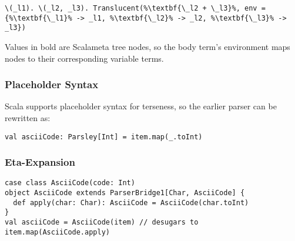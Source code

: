 \documentclass[../../main.tex]{subfiles}
\begin{document}
\begin{lstlisting}
\(_l1). \(_l2, _l3). Translucent(%\textbf{\_l2 + \_l3}%, env = {%\textbf{\_l1}% -> _l1, %\textbf{\_l2}% -> _l2, %\textbf{\_l3}% -> _l3})
\end{lstlisting}
Values in bold are Scalameta tree nodes, so the body term's environment maps  nodes to their corresponding variable terms.

\subsubsection{Placeholder Syntax}
Scala supports placeholder syntax for terseness, so the earlier parser can be rewritten as:
\begin{verbatim}
val asciiCode: Parsley[Int] = item.map(_.toInt)
\end{verbatim}

\subsubsection{Eta-Expansion}
\begin{verbatim}
case class AsciiCode(code: Int)
object AsciiCode extends ParserBridge1[Char, AsciiCode] {
  def apply(char: Char): AsciiCode = AsciiCode(char.toInt)
}
val asciiCode = AsciiCode(item) // desugars to item.map(AsciiCode.apply)
\end{verbatim}
\end{document}
